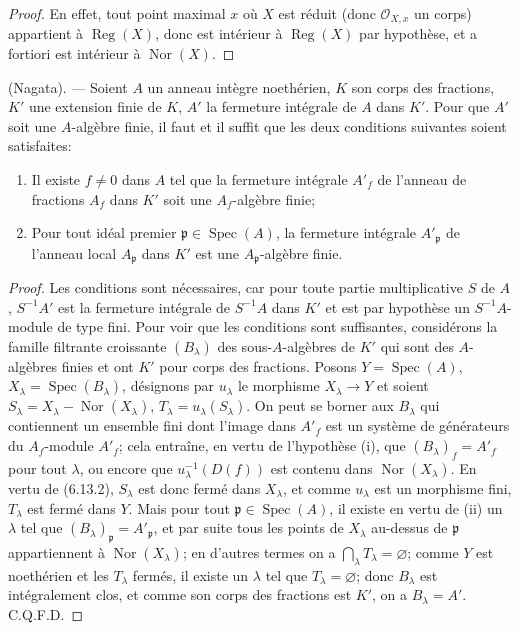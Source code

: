 \begin{proof}
En effet, tout point maximal $x$ où $X$ est réduit (donc
$\mathcal O_{X,x}$ un corps) appartient à $\operatorname{Reg}(X)$, donc est
intérieur à $\operatorname{Reg}(X)$ par hypothèse, et a fortiori est
intérieur à $\operatorname{Nor}(X)$.
\end{proof}

\begin{proposition}[6.13.6]
\label{IV.2.s6.13.6-fr}
\textnormal{(Nagata).} --- Soient $A$ un anneau intègre noethérien, $K$ son
corps des fractions, $K'$ une extension finie de $K$, $A'$ la fermeture
intégrale de $A$ dans $K'$. Pour que $A'$ soit une $A$-algèbre finie, il
faut et il suffit que les deux conditions suivantes soient satisfaites:
\begin{enumerate}
\item[(i)] Il existe $f\neq0$ dans $A$ tel que la fermeture intégrale $A'_f$
de l'anneau de fractions $A_f$ dans $K'$ soit une $A_f$-algèbre finie;
\item[(ii)] Pour tout idéal premier $\mathfrak p\in\operatorname{Spec}(A)$,
la fermeture intégrale $A'_\mathfrak p$ de l'anneau local $A_\mathfrak p$
dans $K'$ est une $A_\mathfrak p$-algèbre finie.
\end{enumerate}
\end{proposition}

\begin{proof}
Les conditions sont nécessaires, car pour toute partie multiplicative $S$
de $A$, $S^{-1}A'$ est la fermeture intégrale de $S^{-1}A$ dans $K'$ et est
par hypothèse un $S^{-1}A$-module de type fini. Pour voir que les conditions
sont suffisantes, considérons la famille filtrante croissante $(B_\lambda)$
des sous-$A$-algèbres de $K'$ qui sont des $A$-algèbres finies et ont $K'$
pour corps des fractions. Posons $Y=\operatorname{Spec}(A)$,
$X_\lambda=\operatorname{Spec}(B_\lambda)$, désignons par $u_\lambda$ le
morphisme $X_\lambda\to Y$ et soient
$S_\lambda=X_\lambda-\operatorname{Nor}(X_\lambda)$,
$T_\lambda=u_\lambda(S_\lambda)$. On peut se borner aux $B_\lambda$ qui
contiennent un ensemble fini dont l'image dans $A'_f$ est un système de
générateurs du $A_f$-module $A'_f$; cela entraîne, en vertu de l'hypothèse
(i), que $(B_\lambda)_f=A'_f$ pour tout $\lambda$, ou encore que
$u_\lambda^{-1}(D(f))$ est contenu dans $\operatorname{Nor}(X_\lambda)$. En
vertu de (6.13.2), $S_\lambda$ est donc fermé dans $X_\lambda$, et comme
$u_\lambda$ est un morphisme fini, $T_\lambda$ est fermé dans $Y$. Mais
pour tout $\mathfrak p\in\operatorname{Spec}(A)$, il existe en vertu de
(ii) un $\lambda$ tel que $(B_\lambda)_\mathfrak p=A'_\mathfrak p$, et par
suite tous les points
de $X_\lambda$ au-dessus de $\mathfrak p$ appartiennent à
$\operatorname{Nor}(X_\lambda)$; en d'autres termes on a
$\bigcap_\lambda T_\lambda=\varnothing$; comme $Y$ est noethérien et les
$T_\lambda$ fermés, il existe un $\lambda$ tel que
$T_\lambda=\varnothing$; donc $B_\lambda$ est intégralement clos, et comme
son corps des fractions est $K'$, on a $B_\lambda=A'$. C.Q.F.D.
\end{proof}

